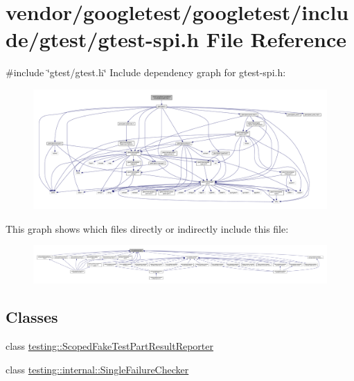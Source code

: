 \hypertarget{gtest-spi_8h}{}\section{vendor/googletest/googletest/include/gtest/gtest-\/spi.h File Reference}
\label{gtest-spi_8h}
{\ttfamily \#include \char`\"{}gtest/gtest.\+h\char`\"{}}\newline
Include dependency graph for gtest-\/spi.h\+:
\nopagebreak
\begin{figure}[H]
\begin{center}
\leavevmode
\includegraphics[width=350pt]{gtest-spi_8h__incl}
\end{center}
\end{figure}
This graph shows which files directly or indirectly include this file\+:
\nopagebreak
\begin{figure}[H]
\begin{center}
\leavevmode
\includegraphics[width=350pt]{gtest-spi_8h__dep__incl}
\end{center}
\end{figure}
\subsection*{Classes}
\begin{DoxyCompactItemize}
\item 
class \hyperlink{classtesting_1_1_scoped_fake_test_part_result_reporter}{testing\+::\+Scoped\+Fake\+Test\+Part\+Result\+Reporter}
\item 
class \hyperlink{classtesting_1_1internal_1_1_single_failure_checker}{testing\+::internal\+::\+Single\+Failure\+Checker}
\end{DoxyCompactItemize}
